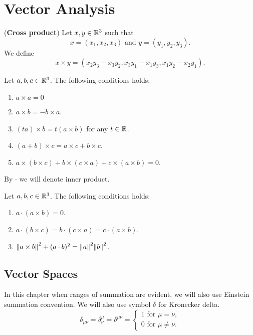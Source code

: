 \documentclass[main.tex]{subfiles}
\begin{document}
\section{Vector Analysis}
\begin{definition}(\textbf{Cross product})
Let $x, y\in \mathbb{R}^3$ such that 
\begin{equation}
x = (x_1, x_2, x_3) \text{ and } y = (y_1, y_2, y_3).
\end{equation}
We define
\begin{equation}
x \times y = (x_2y_3 - x_3y_2, x_3y_1 - x_1y_3, x_1y_2 - x_2y_1).
\end{equation}
\end{definition}
\begin{theorem}
\label{algebraic-cross}
Let $a,b,c\in \mathbb{R}^3$. The following conditions holds:
\begin{enumerate}
\item $a\times a = 0$
\item $a\times b = - b\times a$.
\item $(ta)\times b = t(a\times b)$ for any $t\in\mathbb{R}$.
\item $(a + b)\times c = a\times c + b \times c$.
\item $a\times(b\times c) + b \times (c\times a) + c \times (a\times b) = 0$.
\end{enumerate}
\end{theorem}
\label{inner-cross}
By $\cdot$ we will denote inner product.
\begin{theorem}
Let $a,b,c\in \mathbb{R}^3$. The following conditions holds:
\begin{enumerate}
\item $a \cdot (a\times b) = 0$.
\item $a \cdot (b\times c) = b \cdot (c \times a) = c \cdot (a \times b)$.
\item $\norm{a\times b}^2 + (a\cdot b)^2 = \norm{a}^2\norm{b}^2$.
\end{enumerate}
\end{theorem}
\subsection{Vector Spaces}
In this chapter when ranges of summation are evident, we will also use Einstein summation convention. We will also use symbol $\delta$ for Kronecker delta.
\begin{equation}
\delta_{\mu\nu} = \delta^\mu_\nu = \delta^{\mu\nu} =
\begin{cases}
1 \text{ for } \mu = \nu, \\
0 \text{ for } \mu \not= \nu.
\end{cases}
\end{equation}
\end{document}
